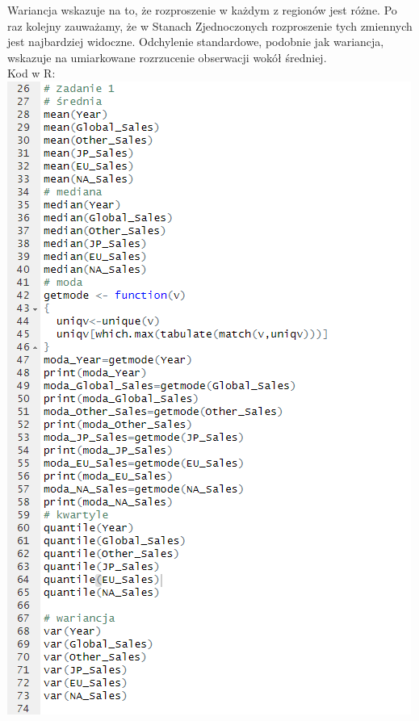 \documentclass[12pt]{article}
\begin{document}
Wariancja wskazuje na to, że rozproszenie w każdym z regionów jest różne. Po raz kolejny zauważamy, że w Stanach Zjednoczonych rozproszenie tych zmiennych jest najbardziej widoczne.
Odchylenie standardowe, podobnie jak wariancja, wskazuje na umiarkowane rozrzucenie obserwacji wokół średniej.\\
	Kod w R:\newpage
	\includegraphics[scale=0.6]{Zad1}\\
\end{document}
